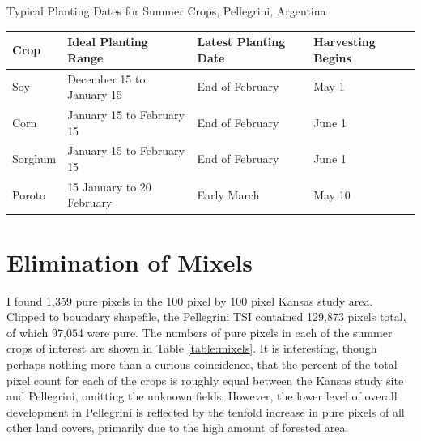 \begin{sstable}
  \centering
  \caption{Typical Planting Dates for Summer Crops, Pellegrini, Argentina}
  \label{table:plantingdates}
  \begin{tabu}{X[0.45,m,c]X[1,m,c]X[.95,m,c]X[0.5,m,c]}
    \toprule
    \textbf{Crop} & \textbf{Ideal Planting Range} & \textbf{Latest Planting Date} & \textbf{Harvesting Begins} \\
    \midrule
    Soy & December 15 to January 15 & End of February & May 1 \\
    Corn & January 15 to February 15 & End of February & June 1 \\
    Sorghum & January 15 to February 15 & End of February & June 1 \\
    Poroto & 15 January to 20 February & Early March & May 10 \\
    \bottomrule
  \end{tabu}
\end{sstable}


\section{Elimination of Mixels}

I found 1,359 pure pixels in the 100 pixel by 100 pixel Kansas study area. Clipped to boundary shapefile, the Pellegrini TSI contained 129,873 pixels total, of which 97,054 were pure. The numbers of pure pixels in each of the summer crops of interest are shown in Table \ref{table:mixels}. It is interesting, though perhaps nothing more than a curious coincidence, that the percent of the total pixel count for each of the crops is roughly equal between the Kansas study site and Pellegrini, omitting the unknown fields. However, the lower level of overall development in Pellegrini is reflected by the tenfold increase in pure pixels of all other land covers, primarily due to the high amount of forested area. 


